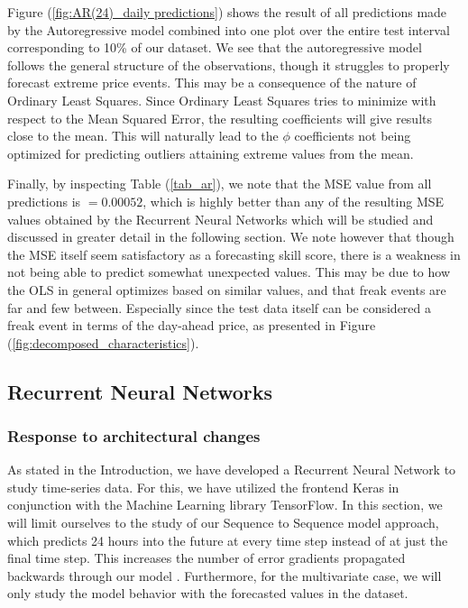 \documentclass
[twocolumn,
secnumarabic,
nobibnotes,
aps,
prl,
reprint,
groupedaddress,
amsmath,
amssymb,
]{revtex4-2}
\begin{document}
Figure (\ref{fig:AR(24)_daily predictions}) shows the result of all predictions made by the Autoregressive model combined into one plot over the entire test interval corresponding to 10\% of our dataset. We see that the autoregressive model follows the general structure of the observations, though it struggles to properly forecast extreme price events. This may be a consequence of the nature of Ordinary Least Squares. Since Ordinary Least Squares tries to minimize with respect to the Mean Squared Error, the resulting coefficients will give results close to the mean. This will naturally lead to the $\phi$ coefficients not being optimized for predicting outliers attaining extreme values from the mean.

Finally, by inspecting Table (\ref{tab_ar}), we note that the MSE value from all predictions is $=0.00052$, which is highly better than any of the resulting MSE values obtained by the Recurrent Neural Networks which will be studied and discussed in greater detail in the following section. We note however that though the MSE itself seem satisfactory as a forecasting skill score, there is a weakness in not being able to predict somewhat unexpected values. This may be due to how the OLS in general optimizes based on similar values, and that freak events are far and few between. Especially since the test data itself can be considered a freak event in terms of the day-ahead price, as presented in Figure (\ref{fig:decomposed_characteristics}).

\subsection{Recurrent Neural Networks}

\subsubsection{Response to architectural changes}
As stated in the Introduction, we have developed a Recurrent Neural Network to study time-series data. For this, we have utilized the frontend Keras in conjunction with the Machine Learning library TensorFlow. In this section, we will limit ourselves to the study of our Sequence to Sequence model approach, which predicts 24 hours into the future at every time step instead of at just the final time step. This increases the number of error gradients propagated backwards through our model \cite{Geron2019}. Furthermore, for the multivariate case, we will only study the model behavior with the forecasted values in the dataset. 
\end{document}
